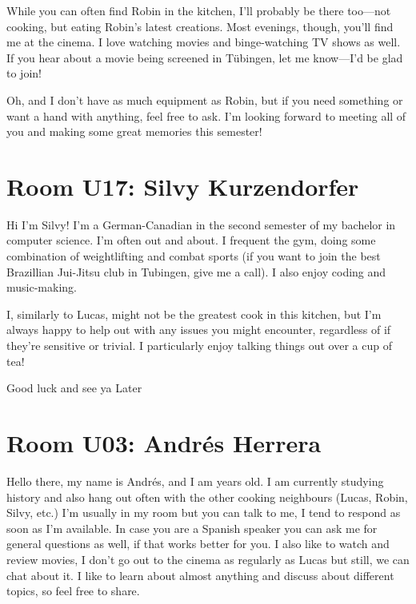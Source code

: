 While you can often find Robin in the kitchen, I’ll probably be there too—not cooking, but eating Robin’s latest creations. Most evenings, though, you’ll find me at the cinema. I love watching movies and binge-watching TV shows as well. If you hear about a movie being screened in Tübingen, let me know—I’d be glad to join!  

Oh, and I don’t have as much equipment as Robin, but if you need something or want a hand with anything, feel free to ask. I’m looking forward to meeting all of you and making some great memories this semester!

\section{Room U17: Silvy Kurzendorfer} \label{sec:silvyK}
%
\FPsub\result{\theCurrentDate}{\theBirthdate}
\FPdiv{}
\FPtrunc{}

Hi I'm Silvy! I'm a German-Canadian in the second semester of my bachelor in computer science. I'm often out and about. I frequent the gym, doing some combination of weightlifting and combat sports (if you want to join the best Brazillian Jui-Jitsu club in Tubingen, give me a call). I also enjoy coding and music-making. 

I, similarly to Lucas, might not be the greatest cook in this kitchen, but I'm always happy to help out with any issues you might encounter, regardless of if they're sensitive or trivial. I particularly enjoy talking things out over a cup of tea!

Good luck and see ya Later

\section{Room U03: Andrés Herrera} \label{sec:andresH}
%
\FPsub\result{\theCurrentDate}{\theBirthdate}
\FPdiv{}
\FPtrunc{}

Hello there, my name is Andrés, and I am \myage{} years old. I am currently studying history and also hang out often with the other cooking neighbours (Lucas, Robin, Silvy, etc.) I’m usually in my room but you can talk to me, I tend to respond as soon as I’m available. In case you are a Spanish speaker you can ask me for general questions as well, if that works better for you. I also like to watch and review movies, I don’t go out to the cinema as regularly as Lucas but still, we can chat about it. I like to learn about almost anything and discuss about different topics, so feel free to share. 
